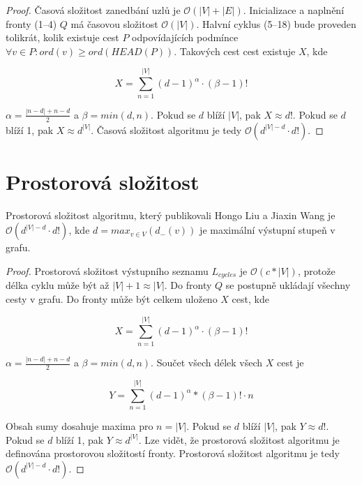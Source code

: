         \begin{proof}
            Časová složitost zanedbání uzlů je $\mathcal{O}(|V| + |E|)$. Inicializace a naplnění fronty (1--4) $Q$ má časovou složitost $\mathcal{O}(|V|)$. Halvní cyklus (5--18) bude proveden tolikrát, kolik existuje cest $P$ odpovídajících podmínce  $\forall v \in P: ord(v) \geq ord(HEAD(P))$. Takových cest cest existuje $X$, kde

            $$
            X = \sum_{n = 1}^{|V|}(d-1)^\alpha\cdot(\beta -1)!
            $$

            \noindent $\alpha = \frac{|n - d| + n - d}{2}$ a $\beta = min(d, n)$. Pokud se $d$ blíží $|V|$, pak $X \approx d!$. Pokud se $d$ blíží 1, pak $X \approx d^{|V|}$. Časová složitost algoritmu je tedy $\mathcal{O}(d^{|V|-d}\cdot d!)$.

        \end{proof}

    \section{Prostorová složitost}
        \begin{theorem}
            Prostorová složitost algoritmu, který publikovali Hongo Liu a Jiaxin Wang je $\mathcal{O}(d^{|V|-d}\cdot d!)$, kde $d = max_{v\in V}(d_-(v))$ je maximální výstupní stupeň v grafu.
        \end{theorem}

        \begin{proof}
            Prostorová složitost výstupního seznamu $L_{cycles}$ je $\mathcal{O}(c * |V|)$, protože délka cyklu může být až $|V| + 1 \approx |V|$. Do fronty $Q$ se postupně ukládají všechny cesty v grafu. Do fronty může být celkem uloženo $X$ cest, kde

            $$
            X = \sum_{n = 1}^{|V|}(d-1)^\alpha\cdot(\beta -1)!
            $$

            \noindent $\alpha = \frac{|n - d| + n - d}{2}$ a $\beta = min(d, n)$. Součet všech délek všech $X$ cest je

            $$
            Y = \sum_{n = 1}^{|V|}(d-1)^\alpha*(\beta -1)! \cdot n
            $$

            \noindent Obsah sumy dosahuje maxima pro $n = |V|$. Pokud se $d$ blíží $|V|$, pak $Y \approx d!$. Pokud  se $d$ blíží 1, pak $Y \approx d^{|V|}$. Lze vidět, že prostorová složitost algoritmu je definována prostorovou složitostí fronty. Prostorová složitost algoritmu je tedy $\mathcal{O}(d^{|V|-d}\cdot d!)$.
        \end{proof}

